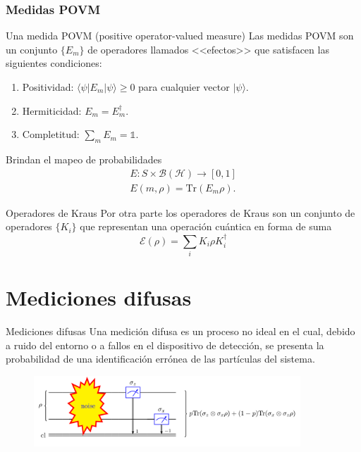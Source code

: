 \documentclass[svgnames,12pt,aspectratio=149]{beamer}
\newcommand{\E}{\mathcal{E}}
\begin{document}
\begin{frame}
\frametitle{Medidas POVM}
    \begin{block}{}
      Una medida POVM (positive operator-valued measure) 
Las medidas POVM son  un conjunto $\{E_{m}\}$ de operadores llamados <<efectos>> que satisfacen las siguientes condiciones:
\begin{enumerate}
    \item Positividad: $\langle \psi |E_m|\psi \rangle \ge 0 $ para cualquier vector $|\psi\rangle$.
    \item Hermiticidad: $E_m=E_{m}^\dagger$.
    \item  Completitud: $\sum_m E_m =\mathds{1}$.
\end{enumerate}
    \end{block}
  Brindan el mapeo de probabilidades \begin{equation*}\begin{split}
      E:S\times \mathcal{B(H)}\longrightarrow [0,1]\\
      E(m,\rho)=\text{Tr}(E_m\rho).
  \end{split}\end{equation*}


\end{frame}

\begin{frame}{Operadores de Kraus}
  Por otra parte los operadores de Kraus son un conjunto de operadores $\{K_i\} $ que representan una operación cuántica en forma de suma \begin{equation*}
    \E(\rho)=\sum_i K_i\rho K_i^\dagger \end{equation*}
\end{frame}







\section{Mediciones difusas}

\begin{frame}{Mediciones difusas}
Una medición difusa es un proceso no ideal en el cual, debido a ruido
del entorno o a fallos en el dispositivo de detección, se presenta la probabilidad de una
identificación errónea de las partículas del sistema.
\vspace{1cm}
\begin{figure}[H]
  \centering
 \includegraphics[width=100mm]{images/fm1.png}
  \caption*{}
\end{figure} 
\end{frame}
\end{document}
